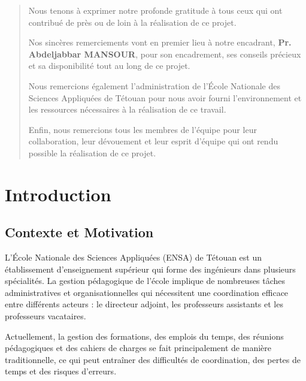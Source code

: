 \documentclass[12pt,a4paper]{report}
\begin{document}
\begin{quotation}
    Nous tenons à exprimer notre profonde gratitude à tous ceux qui ont contribué de près ou de loin à la réalisation de ce projet.
    
    \vspace{1cm}
    
    Nos sincères remerciements vont en premier lieu à notre encadrant, \textbf{Pr. Abdeljabbar MANSOUR}, pour son encadrement, ses conseils précieux et sa disponibilité tout au long de ce projet.
    
    \vspace{0.5cm}
    
    Nous remercions également l'administration de l'École Nationale des Sciences Appliquées de Tétouan pour nous avoir fourni l'environnement et les ressources nécessaires à la réalisation de ce travail.
    
    \vspace{0.5cm}
    
    Enfin, nous remercions tous les membres de l'équipe pour leur collaboration, leur dévouement et leur esprit d'équipe qui ont rendu possible la réalisation de ce projet.
\end{quotation}

\newpage
\thispagestyle{empty}
\mbox{}

\tableofcontents
\newpage
\listoffigures
\newpage
\listoftables


\chapter{Introduction}
\thispagestyle{fancy}

\section{Contexte et Motivation}

L'École Nationale des Sciences Appliquées (ENSA) de Tétouan est un établissement d'enseignement supérieur qui forme des ingénieurs dans plusieurs spécialités. La gestion pédagogique de l'école implique de nombreuses tâches administratives et organisationnelles qui nécessitent une coordination efficace entre différents acteurs : le directeur adjoint, les professeurs assistants et les professeurs vacataires.

Actuellement, la gestion des formations, des emplois du temps, des réunions pédagogiques et des cahiers de charges se fait principalement de manière traditionnelle, ce qui peut entraîner des difficultés de coordination, des pertes de temps et des risques d'erreurs.
\end{document}
